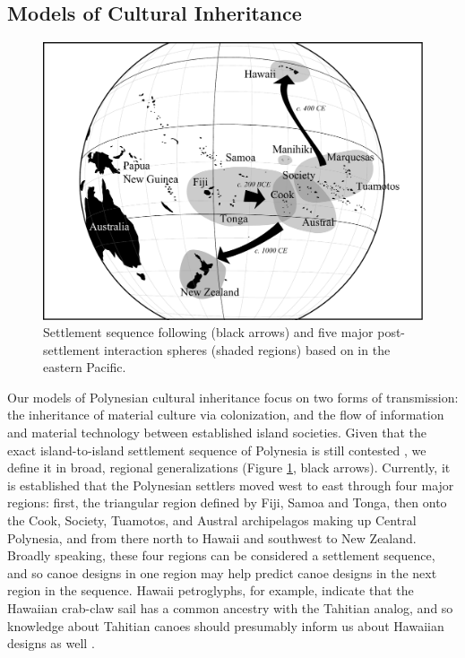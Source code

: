 \documentclass[11pt]{article}
\begin{document}
\subsection{Models of Cultural Inheritance}

\begin{figure}[t]
  \begin{center}
    \includegraphics[scale=0.4]{figures/map.pdf}
  \end{center}
  \caption{\small Settlement sequence following \cite{Kirch2000:Road} (black arrows) and five major post-settlement interaction spheres (shaded regions) based on \cite{Weisler1998} in the eastern Pacific.}
  \label{fig:map}
\end{figure}

Our models of Polynesian cultural inheritance focus on two forms of transmission: the inheritance of material culture via colonization, and the flow of information and material technology between established island societies. Given that the exact island-to-island settlement sequence of Polynesia is still contested \citep{Kirch2000:Road, RogersFeldmanEhrlich2009}, we define it in broad, regional generalizations (Figure \ref{fig:map}, black arrows). Currently, it is established that the Polynesian settlers moved west to east through four major regions: first, the triangular region defined by Fiji, Samoa and Tonga, then onto the Cook, Society, Tuamotos, and Austral archipelagos making up Central Polynesia, and from there north to Hawaii and southwest to New Zealand. Broadly speaking, these four regions can be considered a settlement sequence, and so canoe designs in one region may help predict canoe designs in the next region in the sequence. Hawaii petroglyphs, for example, indicate that the Hawaiian crab-claw sail has a common ancestry with the Tahitian analog, and so knowledge about Tahitian canoes should presumably inform us about Hawaiian designs as well \citep{Lewis1978:PacificNavigators}.
\end{document}
